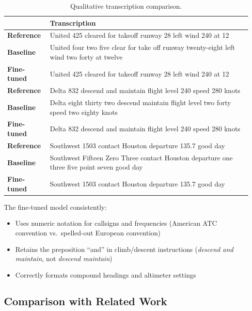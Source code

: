 \documentclass[11pt,a4paper]{article}
\begin{document}
\begin{table}[h]
\centering
\caption{Qualitative transcription comparison.}
\label{tab:qualitative}
\begin{tabularx}{\linewidth}{lX}
\toprule
& \textbf{Transcription} \\
\midrule
\textbf{Reference}  & United 425 cleared for takeoff runway 28 left wind 240 at 12 \\
\textbf{Baseline}   & United four two five clear for take off runway twenty-eight left wind two forty at twelve \\
\textbf{Fine-tuned} & United 425 cleared for takeoff runway 28 left wind 240 at 12 \\
\midrule
\textbf{Reference}  & Delta 832 descend and maintain flight level 240 speed 280 knots \\
\textbf{Baseline}   & Delta eight thirty two descend maintain flight level two forty speed two eighty knots \\
\textbf{Fine-tuned} & Delta 832 descend and maintain flight level 240 speed 280 knots \\
\midrule
\textbf{Reference}  & Southwest 1503 contact Houston departure 135.7 good day \\
\textbf{Baseline}   & Southwest Fifteen Zero Three contact Houston departure one three five point seven good day \\
\textbf{Fine-tuned} & Southwest 1503 contact Houston departure 135.7 good day \\
\bottomrule
\end{tabularx}
\end{table}

The fine-tuned model consistently:
\begin{itemize}[noitemsep]
  \item Uses numeric notation for callsigns and frequencies
        (American ATC convention vs.\ spelled-out European convention)
  \item Retains the preposition ``and'' in climb/descent instructions
        (\textit{descend and maintain}, not \textit{descend maintain})
  \item Correctly formats compound headings and altimeter settings
\end{itemize}

\subsection{Comparison with Related Work}
\end{document}
